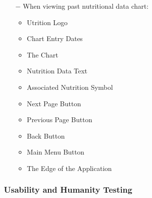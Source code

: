 \documentclass[12pt, titlepage]{article}
\begin{document}
\begin{enumerate}
\begin{enumerate}
\begin{itemize}
	\end{itemize}
	\item[$-$] When viewing past nutritional data chart:
	\begin{itemize}
		\item Utrition Logo
		\item Chart Entry Dates
		\item The Chart
		\item Nutrition Data Text
		\item Associated Nutrition Symbol
		\item Next Page Button
		\item Previous Page Button
		\item Back Button
		\item Main Menu Button
		\item The Edge of the Application	
	\end{itemize}
	
\end{enumerate}
	
\end{enumerate}

\subsubsection{Usability and Humanity Testing}

\end{document}
